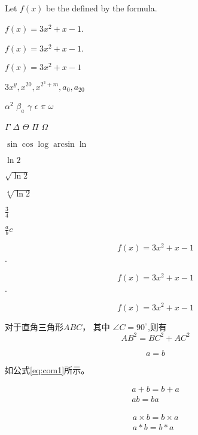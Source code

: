 \documentclass[12pt]{article} %
\newcommand{\degree}{^\circ}
\begin{document}
	
	
	Let $f(x)$ be the defined by the formula.
	
	$f(x)=3x^2+x-1$.
	
	\(f(x)=3x^2+x-1\).
	
	\begin{math}
		f(x)=3x^2+x-1
	\end{math}
	
	\begin{math}
	3x^y,x^{20},x^{2^3+m},a_0,a_{20}
	\end{math}
	
	$\alpha^2$
	$\beta_a$
	$\gamma$
	$\epsilon$
	$\pi$
	$\omega$
	
	$\Gamma$
	$\Delta$
	$\Theta$
	$\Pi$
	$\Omega$
	
	$\sin \cos \log \arcsin \ln$
	
	$\ln 2$
	
	$\sqrt{\ln 2}$
	
	$\sqrt[4]{\ln 2}$
	
	$\frac{3}{4}$
	
	$\frac abc$
	
	$$f(x)=3x^2+x-1$$.
	
	\[f(x)=3x^2+x-1\].
	
	\begin{displaymath}
		f(x)=3x^2+x-1
	\end{displaymath}
	
	对于直角三角形$ABC$， 其中 $\angle C=90\degree$,则有
	\begin{equation}
	AB^2 = BC^2 + AC^2	\label{eq:com1}
	\end{equation}
	
	\begin{equation*}	%
		a=b	\label{eq:com2}
	\end{equation*}
	
	
	如公式\ref{eq:com1}所示。
	
	\begin{gather}
		a+b=b+a\\
		ab=ba
	\end{gather}
	
	\begin{gather*}
		a\times b=b \times a\\
		a*b=b*a
	\end{gather*}
	
\end{document}
